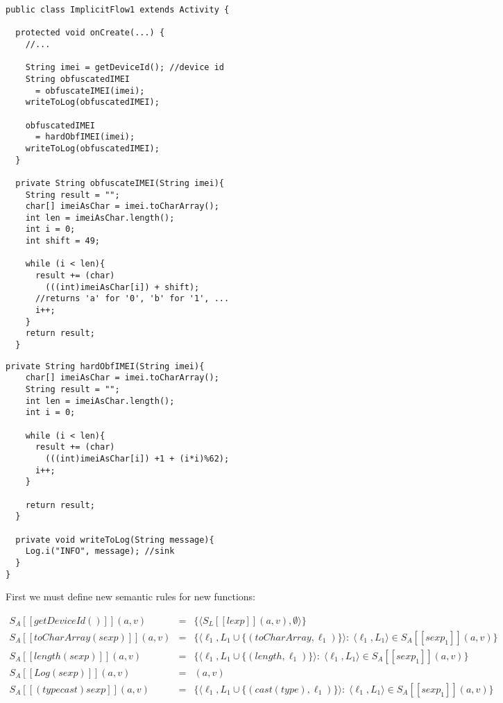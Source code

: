 \documentclass{llncs}
\begin{document}
\begin{center}
\begin{multicols}{2}
\begin{lstlisting}[basicstyle=\sffamily\scriptsize]
public class ImplicitFlow1 extends Activity {

  protected void onCreate(...) {
    //...

    String imei = getDeviceId(); //device id 
    String obfuscatedIMEI 
      = obfuscateIMEI(imei);
    writeToLog(obfuscatedIMEI);
		
    obfuscatedIMEI 
      = hardObfIMEI(imei);
    writeToLog(obfuscatedIMEI); 		
  }
	
  private String obfuscateIMEI(String imei){
    String result = "";
    char[] imeiAsChar = imei.toCharArray();
    int len = imeiAsChar.length();			
    int i = 0;
    int shift = 49;	
	
    while (i < len){
      result += (char) 
        (((int)imeiAsChar[i]) + shift);
      //returns 'a' for '0', 'b' for '1', ...
      i++;
    }
    return result;
  }
\end{lstlisting}
\vfill\columnbreak

\begin{lstlisting}[firstnumber=31, basicstyle=\sffamily\scriptsize]
  private String hardObfIMEI(String imei){		
    char[] imeiAsChar = imei.toCharArray();		
    String result = "";    
    int len = imeiAsChar.length();
    int i = 0;
    
    while (i < len){
      result += (char) 
        (((int)imeiAsChar[i]) +1 + (i*i)%62);
      i++;
    }
	
    return result;
  }
	
  private void writeToLog(String message){
    Log.i("INFO", message); //sink
  }    
}
\end{lstlisting}
\end{multicols}
\end{center}

\noindent First we must define new semantic rules for new functions:
\begin{center}
{\footnotesize
$\begin{array}{rcl}
S_A [\![ getDeviceId() ]\!](a, v) & = & \{ \langle S_L [\![lexp ]\!](a, v), \emptyset\rangle \}\\
S_A [\![ toCharArray(sexp) ]\!](a, v) & = &
\{  \langle \ell_1, L_1 \cup \{(toCharArray, \ell_1)\} \rangle : \; \langle \ell_1, L_1 \rangle \in  S_A [\![sexp_1 ]\!](a, v) \}\; \\
S_A [\![ length(sexp) ]\!](a, v) & = &
\{  \langle \ell_1, L_1 \cup \{(length, \ell_1)\} \rangle : \; \langle \ell_1, L_1 \rangle \in  S_A [\![sexp_1 ]\!](a, v) \}\; \\
S_A [\![Log(sexp)]\!](a, v) & = &  (a, v)\\
S_A [\![ (typecast) sexp ]\!](a, v) & = &
\{  \langle \ell_1, L_1 \cup \{(cast(type), \ell_1)\} \rangle : \; \langle \ell_1, L_1 \rangle \in  S_A [\![sexp_1 ]\!](a, v) \}\; \\
\end{array}$}
\end{center}
\end{document}
